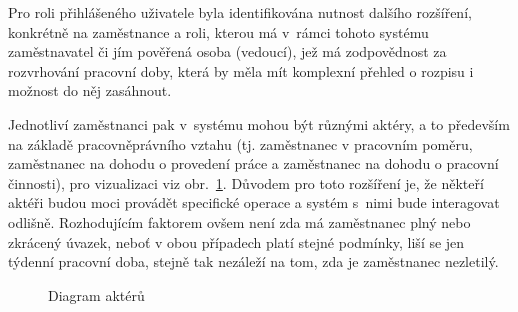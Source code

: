 \documentclass[twoside]{ctuthesis}
\begin{document}
\begin{enumerate}[label=\textbf{O\arabic*.}]
Pro roli přihlášeného uživatele byla identifikována nutnost dalšího rozšíření, konkrétně na zaměstnance a roli, kterou má v~rámci tohoto systému za\-měst\-na\-va\-tel či jím pověřená osoba (vedoucí), jež má zodpovědnost za rozvrhování pracovní doby, která by měla mít komplexní přehled o rozpisu i možnost do něj zasáhnout.

Jednotliví zaměstnanci pak v~systému mohou být různými aktéry, a to především na základě pracovněprávního vztahu (tj. zaměstnanec v pracovním poměru, zaměstnanec na dohodu o provedení práce a zaměstnanec na dohodu o pracovní činnosti), pro vizualizaci viz obr.~\ref{fig:userroles}. Důvodem pro toto rozšíření je, že někteří aktéři budou moci provádět specifické operace a systém s~nimi bude interagovat odlišně. Rozhodujícím faktorem ovšem není zda má zaměstnanec plný nebo zkrácený úvazek, neboť v obou případech platí stejné podmínky, liší se jen týdenní pracovní doba, stejně tak nezáleží na tom, zda je zaměstnanec nezletilý.

\begin{figure}[h]
	
	\caption{Diagram aktérů}
	\label{fig:userroles}
\end{figure}

%
%


\end{enumerate}
\end{document}
